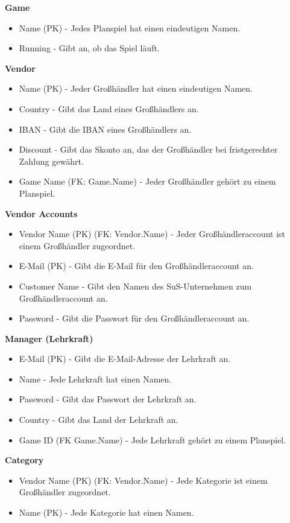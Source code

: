 \noindent \textbf{Game}
\begin{itemize}
    \item Name (PK) - Jedes Planspiel hat einen eindeutigen Namen.
    \item Running - Gibt an, ob das Spiel läuft.
\end{itemize}

\noindent \textbf{Vendor}
\begin{itemize}
    \item Name (PK) - Jeder Großhändler hat einen eindeutigen Namen.
    \item Country - Gibt das Land eines Großhändlers an.
    \item IBAN - Gibt die IBAN eines Großhändlers an.
    \item Discount - Gibt das Skonto an, das der Großhändler bei fristgerechter Zahlung gewährt.
    \item Game Name (FK: Game.Name) - Jeder Großhändler gehört zu einem Planspiel.
\end{itemize}

\noindent \textbf{Vendor Accounts}
\begin{itemize}
    \item Vendor Name (PK) (FK: Vendor.Name) - Jeder Großhändleraccount ist einem Großhändler zugeordnet.
    \item E-Mail (PK) - Gibt die E-Mail für den Großhändleraccount an.
    \item Customer Name - Gibt den Namen des SuS-Unternehmen zum Großhändleraccount an.
    \item Password - Gibt die Passwort für den Großhändleraccount an.
\end{itemize}

\noindent \textbf{Manager (Lehrkraft)}
\begin{itemize}
    \item E-Mail (PK) - Gibt die E-Mail-Adresse der Lehrkraft an.
    \item Name - Jede Lehrkraft hat einen Namen.
    \item Password - Gibt das Passwort der Lehrkraft an.
    \item Country - Gibt das Land der Lehrkraft an.
    \item Game ID (FK Game.Name) - Jede Lehrkraft gehört zu einem Planspiel.
\end{itemize}

\noindent \textbf{Category}
\begin{itemize}
    \item Vendor Name (PK) (FK: Vendor.Name) - Jede Kategorie ist einem Großhändler zugeordnet.
    \item Name (PK) - Jede Kategorie hat einen Namen.
\end{itemize}

